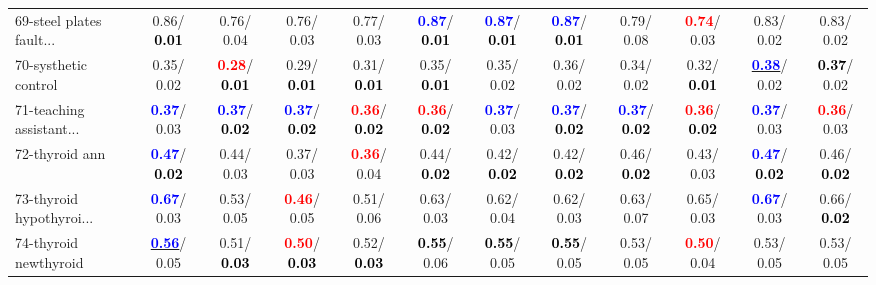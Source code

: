 \begin{table}[h]
\begin{center}
{\begin{tabular}{lc|c|c|c|c|c|c|c|c|c|c}
69-steel plates fault... &   0.86/\textcolor{black}{\textbf{  0.01}} &   0.76/  0.04 &   0.76/  0.03 &   0.77/  0.03 & \textcolor{blue}{\textbf{  0.87}}/\textcolor{black}{\textbf{  0.01}} & \textcolor{blue}{\textbf{  0.87}}/\textcolor{black}{\textbf{  0.01}} & \textcolor{blue}{\textbf{  0.87}}/\textcolor{black}{\textbf{  0.01}} &   0.79/  0.08 & \textcolor{red}{\textbf{  0.74}}/  0.03 &   0.83/  0.02 &   0.83/  0.02 \\
70-systhetic control &   0.35/  0.02 & \textcolor{red}{\textbf{  0.28}}/\textcolor{black}{\textbf{  0.01}} &   0.29/\textcolor{black}{\textbf{  0.01}} &   0.31/\textcolor{black}{\textbf{  0.01}} &   0.35/\textcolor{black}{\textbf{  0.01}} &   0.35/  0.02 &   0.36/  0.02 &   0.34/  0.02 &   0.32/\textcolor{black}{\textbf{  0.01}} & \underline{\textcolor{blue}{\textbf{  0.38}}}/  0.02 & \textcolor{black}{\textbf{  0.37}}/  0.02 \\
71-teaching assistant... & \textcolor{blue}{\textbf{  0.37}}/  0.03 & \textcolor{blue}{\textbf{  0.37}}/\textcolor{black}{\textbf{  0.02}} & \textcolor{blue}{\textbf{  0.37}}/\textcolor{black}{\textbf{  0.02}} & \textcolor{red}{\textbf{  0.36}}/\textcolor{black}{\textbf{  0.02}} & \textcolor{red}{\textbf{  0.36}}/\textcolor{black}{\textbf{  0.02}} & \textcolor{blue}{\textbf{  0.37}}/  0.03 & \textcolor{blue}{\textbf{  0.37}}/\textcolor{black}{\textbf{  0.02}} & \textcolor{blue}{\textbf{  0.37}}/\textcolor{black}{\textbf{  0.02}} & \textcolor{red}{\textbf{  0.36}}/\textcolor{black}{\textbf{  0.02}} & \textcolor{blue}{\textbf{  0.37}}/  0.03 & \textcolor{red}{\textbf{  0.36}}/  0.03 \\ \hline
72-thyroid ann & \textcolor{blue}{\textbf{  0.47}}/\textcolor{black}{\textbf{  0.02}} &   0.44/  0.03 &   0.37/  0.03 & \textcolor{red}{\textbf{  0.36}}/  0.04 &   0.44/\textcolor{black}{\textbf{  0.02}} &   0.42/\textcolor{black}{\textbf{  0.02}} &   0.42/\textcolor{black}{\textbf{  0.02}} &   0.46/\textcolor{black}{\textbf{  0.02}} &   0.43/  0.03 & \textcolor{blue}{\textbf{  0.47}}/\textcolor{black}{\textbf{  0.02}} &   0.46/\textcolor{black}{\textbf{  0.02}} \\
73-thyroid hypothyroi... & \textcolor{blue}{\textbf{  0.67}}/  0.03 &   0.53/  0.05 & \textcolor{red}{\textbf{  0.46}}/  0.05 &   0.51/  0.06 &   0.63/  0.03 &   0.62/  0.04 &   0.62/  0.03 &   0.63/  0.07 &   0.65/  0.03 & \textcolor{blue}{\textbf{  0.67}}/  0.03 &   0.66/\textcolor{black}{\textbf{  0.02}} \\
74-thyroid newthyroid & \underline{\textcolor{blue}{\textbf{  0.56}}}/  0.05 &   0.51/\textcolor{black}{\textbf{  0.03}} & \textcolor{red}{\textbf{  0.50}}/\textcolor{black}{\textbf{  0.03}} &   0.52/\textcolor{black}{\textbf{  0.03}} & \textcolor{black}{\textbf{  0.55}}/  0.06 & \textcolor{black}{\textbf{  0.55}}/  0.05 & \textcolor{black}{\textbf{  0.55}}/  0.05 &   0.53/  0.05 & \textcolor{red}{\textbf{  0.50}}/  0.04 &   0.53/  0.05 &   0.53/  0.05 \\

\end{tabular}}
\end{center}
\end{table}
